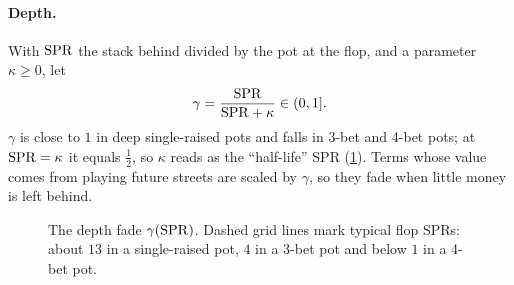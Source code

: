 \paragraph{Depth.} With $\mathrm{SPR}$ the stack behind divided by the pot at the flop, and a parameter $\kappa \ge 0$, let
\begin{equation}\label{eq:gamma}
  \gamma = \frac{\mathrm{SPR}}{\mathrm{SPR} + \kappa} \in (0,1].
\end{equation}
$\gamma$ is close to $1$ in deep single-raised pots and falls in 3-bet and 4-bet pots; at $\mathrm{SPR} = \kappa$ it equals $\tfrac12$, so $\kappa$ reads as the \enquote{half-life} SPR (\cref{fig:gamma}). Terms whose value comes from playing future streets are scaled by $\gamma$, so they fade when little money is left behind.

\begin{figure}[ht]
\centering
{}
\caption{The depth fade $\gamma(\mathrm{SPR})$. Dashed grid lines mark typical flop SPRs: about $13$ in a single-raised pot, $4$ in a 3-bet pot and below $1$ in a 4-bet pot.}
\label{fig:gamma}
\end{figure}

